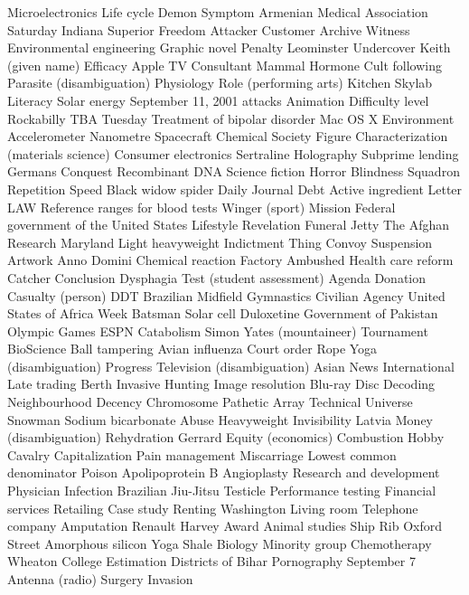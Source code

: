 Microelectronics  Life cycle  Demon  
Symptom  Armenian Medical Association  Saturday  
Indiana  Superior  Freedom  
Attacker  Customer  Archive  
Witness  Environmental engineering  Graphic novel  
Penalty  Leominster  Undercover  
Keith (given name)  Efficacy  Apple TV  
Consultant  Mammal  Hormone  
Cult following  Parasite (disambiguation)  Physiology  
Role (performing arts)  Kitchen  Skylab  
Literacy  Solar energy  September 11, 2001 attacks  
Animation  Difficulty level  Rockabilly  
TBA  Tuesday  Treatment of bipolar disorder  
Mac OS X  Environment  Accelerometer  
Nanometre  Spacecraft  Chemical Society  
Figure  Characterization (materials science)  Consumer electronics  
Sertraline  Holography  Subprime lending  
Germans  Conquest  Recombinant DNA  
Science fiction  Horror  Blindness  
Squadron  Repetition  Speed  
Black widow spider  Daily Journal  Debt  
Active ingredient  Letter  LAW  
Reference ranges for blood tests  Winger (sport)  Mission  
Federal government of the United States  Lifestyle  Revelation  
Funeral  Jetty  The Afghan  
Research  Maryland  Light heavyweight  
Indictment  Thing  Convoy  
Suspension  Artwork  Anno Domini  
Chemical reaction  Factory  Ambushed  
Health care reform  Catcher  Conclusion  
Dysphagia  Test (student assessment)  Agenda  
Donation  Casualty (person)  DDT  
Brazilian  Midfield  Gymnastics  
Civilian  Agency  United States of Africa  
Week  Batsman  Solar cell  
Duloxetine  Government of Pakistan  Olympic Games  
ESPN  Catabolism  Simon Yates (mountaineer)  
Tournament  BioScience  Ball tampering  
Avian influenza  Court order  Rope  
Yoga (disambiguation)  Progress  Television (disambiguation)  
Asian News International  Late trading  Berth  
Invasive  Hunting  Image resolution  
Blu-ray Disc  Decoding  Neighbourhood  
Decency  Chromosome  Pathetic  
Array  Technical  Universe  
Snowman  Sodium bicarbonate  Abuse  
Heavyweight  Invisibility  Latvia  
Money (disambiguation)  Rehydration  Gerrard  
Equity (economics)  Combustion  Hobby  
Cavalry  Capitalization  Pain management  
Miscarriage  Lowest common denominator  Poison  
Apolipoprotein B  Angioplasty  Research and development  
Physician  Infection  Brazilian Jiu-Jitsu  
Testicle  Performance testing  Financial services  
Retailing  Case study  Renting  
Washington  Living room  Telephone company  
Amputation  Renault  Harvey Award  
Animal studies  Ship  Rib  
Oxford Street  Amorphous silicon  Yoga  
Shale  Biology  Minority group  
Chemotherapy  Wheaton College  Estimation  
Districts of Bihar  Pornography  September 7  
Antenna (radio)  Surgery  Invasion  
